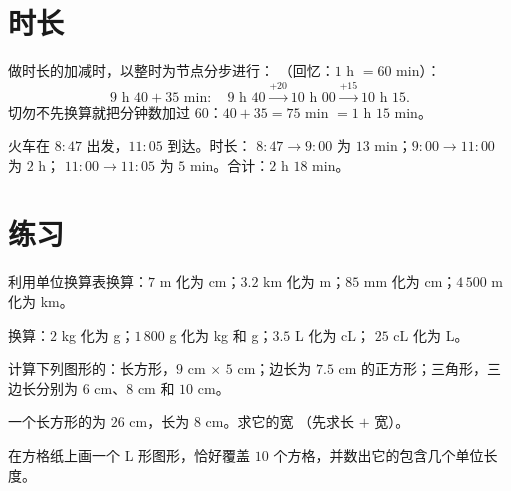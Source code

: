 \section{时长}

\begin{method}[跨过整时的时间加减]\label{met:g4:measure:time}
做时长的加减时，以整时为节点分步进行：
（回忆：$1$ h $= 60$ min）：
\[
9\text{ h }40 + 35 \text{ min}:
\quad 9\text{ h }40 \xrightarrow{+20} 10\text{ h }00
\xrightarrow{+15} 10\text{ h }15 .
\]
切勿不先换算就把分钟数加过 $60$：$40 + 35 = 75$ min
$= 1$ h $15$ min。
\end{method}

\begin{example}\label{ex:g4:measure:timetable}
火车在 $8{:}47$ 出发，$11{:}05$ 到达。时长：
$8{:}47 \to 9{:}00$ 为 $13$ min；$9{:}00 \to 11{:}00$ 为 $2$ h；
$11{:}00 \to 11{:}05$ 为 $5$ min。合计：$2$ h $18$ min。
\end{example}

\section{练习}

\begin{exercise}[$\star$]\label{exo:g4:measure:1}
利用单位换算表换算：$7$ m 化为 cm；$3.2$ km 化为 m；$85$ mm 化为
cm；$4\,500$ m 化为 km。
\end{exercise}

\begin{exercise}[$\star$]\label{exo:g4:measure:2}
换算：$2$ kg 化为 g；$1\,800$ g 化为 kg 和 g；$3.5$ L 化为 cL；
$25$ cL 化为 L。
\end{exercise}

\begin{exercise}[$\star$]\label{exo:g4:measure:3}
计算下列图形的：长方形，$9$ cm $\times$ $5$ cm；边长为
$7.5$ cm 的正方形；三角形，三边长分别为 $6$ cm、$8$ cm 和 $10$ cm。
\end{exercise}

\begin{exercise}[$\star$]\label{exo:g4:measure:4}
一个长方形的为 $26$ cm，长为 $8$ cm。求它的宽
（先求长 $+$ 宽）。
\end{exercise}

\begin{exercise}[$\star$]\label{exo:g4:measure:5}
在方格纸上画一个 L 形图形，恰好覆盖 $10$
个方格，并数出它的包含几个单位长度。
\end{exercise}

